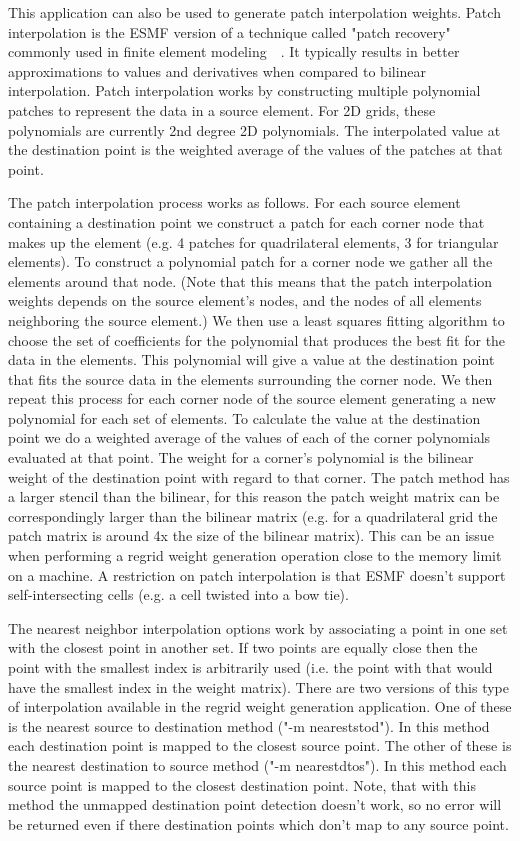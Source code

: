 This application can also be used to generate patch interpolation weights. Patch
interpolation is the ESMF version of a technique called "patch recovery" commonly
used in finite element modeling~\cite{PatchInterp1}~\cite{PatchInterp2}. It typically results in better approximations to values and derivatives when compared to bilinear interpolation.
Patch interpolation works by constructing multiple polynomial patches to represent
the data in a source element. For 2D grids, these polynomials
are currently 2nd degree 2D polynomials. The interpolated value at the destination point
is the weighted average of the values of the patches at that point.

The patch interpolation process works as follows.
For each source element containing a destination point
we construct a patch for each corner node that makes up the element (e.g. 4 patches for
quadrilateral elements, 3 for triangular elements). To construct a polynomial patch for
  a corner node we gather all the elements around that node.
(Note that this means that the patch interpolation weights depends on the source
element's nodes, and the nodes of all elements neighboring the source element.)
We then use a least squares fitting algorithm to choose the set of coefficients
for the polynomial that produces the best fit for the data in the elements.
This polynomial will give a value at the destination point that fits the source data
in the elements surrounding the corner node. We then repeat this process for each
corner node of the source element generating a new polynomial for each set of elements.
To calculate the value at the destination point we do a weighted average of the values
of each of the corner polynomials evaluated at that point. The weight for a corner's
polynomial is the bilinear weight of the destination point with regard to that corner.
The patch method has a larger stencil than the bilinear, for this reason the patch weight matrix can be correspondingly larger
than the bilinear matrix (e.g. for a quadrilateral grid the patch matrix is around 4x the size of
the bilinear matrix). This can be an issue when performing a regrid weight generation operation close to the memory
limit on a machine. A restriction on patch interpolation is that ESMF doesn't support self-intersecting cells (e.g. a cell twisted into a 
bow tie). 

The nearest neighbor interpolation options work by associating a point in one set with the closest point in another set. If two points are equally
close then the point with the smallest index is arbitrarily used (i.e. the point with that would have the smallest index in the weight matrix). There are two
versions of this type of interpolation available in the regrid weight generation application. One of these is the nearest source to destination
method ("-m neareststod"). In this method each destination point is mapped to the closest source point. The other of these is the
nearest destination to source method ("-m nearestdtos"). In this method each source point is mapped to the closest destination point. Note,
that with this method the unmapped destination point detection doesn't work, so no error will be returned even if there destination points
which don't map to any source point.

